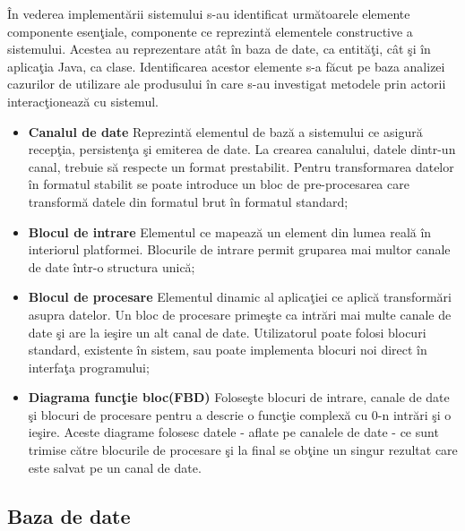 În vederea implementării sistemului s-au identificat următoarele elemente componente esenţiale, componente ce reprezintă elementele constructive a sistemului. Acestea au reprezentare atât în baza de date, ca entităţi, cât şi în aplicaţia Java, ca clase. Identificarea acestor elemente s-a făcut pe baza analizei cazurilor de utilizare ale produsului în care s-au investigat metodele prin actorii interacţionează cu sistemul.
\begin{itemize}
	\label{list:entities}
	\item \textbf{Canalul de date} Reprezintă elementul de bază a sistemului ce asigură recepţia, persistenţa şi emiterea de date.  La crearea canalului, datele dintr-un canal, trebuie să respecte un format prestabilit. Pentru transformarea datelor în formatul stabilit se poate introduce un bloc de pre-procesarea care transformă datele din formatul brut în formatul standard;
	\item \textbf{Blocul de intrare} Elementul ce mapează un element din lumea reală în interiorul platformei. Blocurile de intrare permit gruparea mai multor canale de date într-o structura unică;
	\item \textbf{Blocul de procesare} Elementul dinamic al aplicaţiei ce aplică transformări asupra datelor. Un bloc de procesare primeşte ca intrări mai multe canale de date şi are la ieşire un alt canal de date. Utilizatorul poate folosi blocuri standard, existente în sistem, sau poate implementa blocuri noi direct în interfaţa programului;
	\item \textbf{Diagrama funcţie bloc(FBD)} Foloseşte blocuri de intrare, canale de date şi blocuri de procesare pentru a descrie o funcţie complexă cu 0-n intrări şi o ieşire. Aceste diagrame folosesc datele - aflate pe canalele de date - ce sunt trimise către blocurile de procesare şi la final se obţine un singur rezultat care este salvat pe un canal de date.
\end{itemize}

\subsection{Baza de date}

